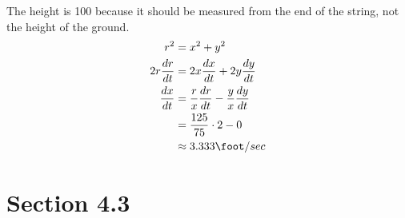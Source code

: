 \documentclass[fleqn]{exam}
\begin{document}
\begin{questions}
\begin{solution}
The height is 100 because it should be measured from the end of the string, not the height of the ground.
\begin{align*}
  r^2 &= x^2 + y^2 \\
  2r \frac{dr}{dt} &= 2x \frac{dx}{dt} + 2y \frac{dy}{dt} \\
  \frac{dx}{dt} &= \frac{r}{x} \frac{dr}{dt} - \frac{y}{x} \frac{dy}{dt} \\
                &= \frac{125}{75} \cdot 2 - 0 \\
                &\approx 3.333 \foot / sec \\
\end{align*}

\end{solution}

\end{questions}

\ifprintanswers

\section{Section 4.3}
\end{document}
